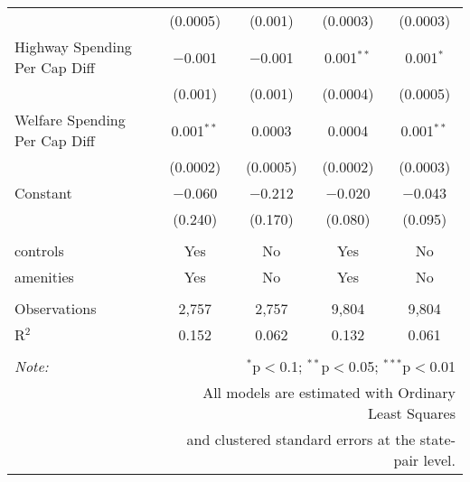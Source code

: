 \begin{table}[!htbp]
\begin{tabular}{@{\extracolsep{5pt}}lcccc}
  & (0.0005) & (0.001) & (0.0003) & (0.0003) \\ 
  Highway Spending Per Cap Diff & $-$0.001 & $-$0.001 & 0.001$^{**}$ & 0.001$^{*}$ \\ 
  & (0.001) & (0.001) & (0.0004) & (0.0005) \\ 
  Welfare Spending Per Cap Diff & 0.001$^{**}$ & 0.0003 & 0.0004 & 0.001$^{**}$ \\ 
  & (0.0002) & (0.0005) & (0.0002) & (0.0003) \\ 
  Constant & $-$0.060 & $-$0.212 & $-$0.020 & $-$0.043 \\ 
  & (0.240) & (0.170) & (0.080) & (0.095) \\ 
 \hline \\[-1.8ex] 
controls & Yes & No & Yes & No \\ 
amenities & Yes & No & Yes & No \\ 
\hline \\[-1.8ex] 
Observations & 2,757 & 2,757 & 9,804 & 9,804 \\ 
R$^{2}$ & 0.152 & 0.062 & 0.132 & 0.061 \\ 
\hline 
\hline \\[-1.8ex] 
\textit{Note:}  & \multicolumn{4}{r}{$^{*}$p$<$0.1; $^{**}$p$<$0.05; $^{***}$p$<$0.01} \\ 
 & \multicolumn{4}{r}{All models are estimated with Ordinary Least Squares} \\ 
 & \multicolumn{4}{r}{and clustered standard errors at the state-pair level.} \\ 
\end{tabular} 
\end{table} 
